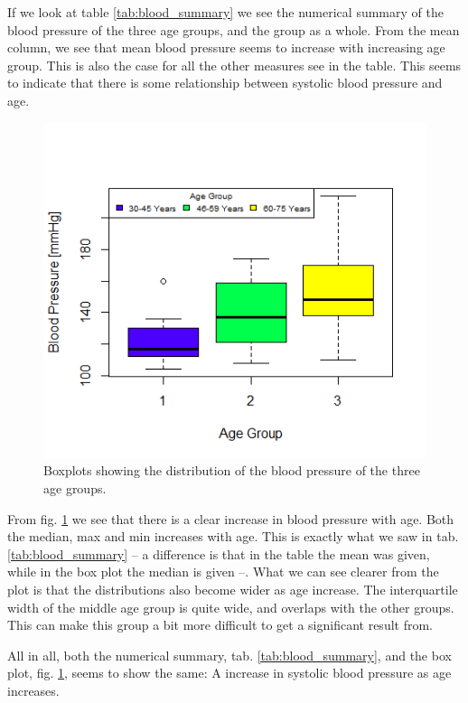 \documentclass[a4paper,norsk, 10pt]{article}
\begin{document}
If we look at table \ref{tab:blood_summary} we see the numerical summary of the blood pressure of the three age groups, and the group as a whole. From the mean column, we see that mean blood pressure seems to increase with increasing age group. This is also the case for all the other measures see in the table. This seems to indicate that there is some relationship between systolic blood pressure and age. 


\begin{figure}[!htbp]
\centering
\includegraphics[scale=0.8]{blood_box.png}
\caption{Boxplots showing the distribution of the blood pressure of the three age groups.}\label{fig:blood_box}
\end{figure}


From fig. \ref{fig:blood_box} we see that there is a clear increase in blood pressure with age. Both the median, max and min increases with age. This is exactly what we saw in tab. \ref{tab:blood_summary} -- a difference is that in the table the mean was given, while in the box plot the median is given --. What we can see clearer from the plot is that the distributions also become wider as age increase. The interquartile width of the middle age group is quite wide, and overlaps with the other groups. This can make this group a bit more difficult to get a significant result from.

All in all, both the numerical summary, tab. \ref{tab:blood_summary}, and the box plot, fig. \ref{fig:blood_box}, seems to show the same: A increase in systolic blood pressure as age increases.
\end{document}
